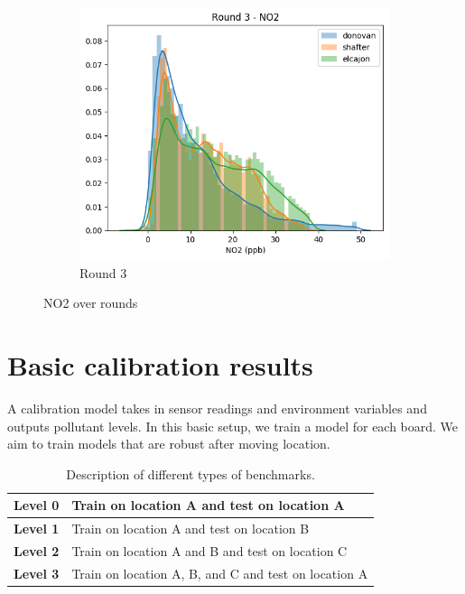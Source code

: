 \documentclass{article}
\begin{document}
\begin{figure}
\begin{subfigure}{0.32\textwidth}
\includegraphics[width=\textwidth]{results/distributions/round3_no2.png}
\caption{Round 3}
\end{subfigure}
\caption{NO2 over rounds}
\label{fig:no2-rounds}
\end{figure}

\section{Basic calibration results}

A calibration model takes in sensor readings and environment
variables and outputs pollutant levels. In this basic setup,
we train a model for each board.
We aim to train models that are robust after moving location.

\begin{table}[H]
\begin{tabular}{|l|l|}
\hline
\textbf{Level 0} & Train on location A and test on location A \\ \hline
\textbf{Level 1} & Train on location A and test on location B \\ \hline
\textbf{Level 2} & Train on location A and B and test on location C \\ \hline
\textbf{Level 3} & Train on location A, B, and C and test on location A \\ \hline
\end{tabular}
\caption{Description of different types of benchmarks.}
\label{tab:levels}
\end{table}
\end{document}
